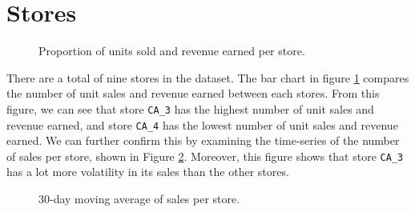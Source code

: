 \section{Stores}
\begin{figure}
    \vspace{-15pt}
    \centering
    \captionsetup{width=0.52\textwidth}
    \caption{Proportion of units sold and revenue earned per store.}
    \label{fig:sales_rev_stores}
    \vspace{-20pt}
\end{figure}
There are a total of nine stores in the dataset.
The bar chart in figure \ref{fig:sales_rev_stores} compares the number of unit sales and revenue earned between each stores.
From this figure, we can see that store \texttt{CA\_3} has the highest number of unit sales and revenue earned, and store \texttt{CA\_4} has the lowest number of unit sales and revenue earned.
We can further confirm this by examining the time-series of the number of sales per store, shown in Figure \ref{fig:store_sales}.
Moreover, this figure shows that store \texttt{CA\_3} has a lot more volatility in its sales than the other stores.
\begin{figure}[H]
    \centering
    \caption{30-day moving average of sales per store.}
    \label{fig:store_sales}
\end{figure} 


